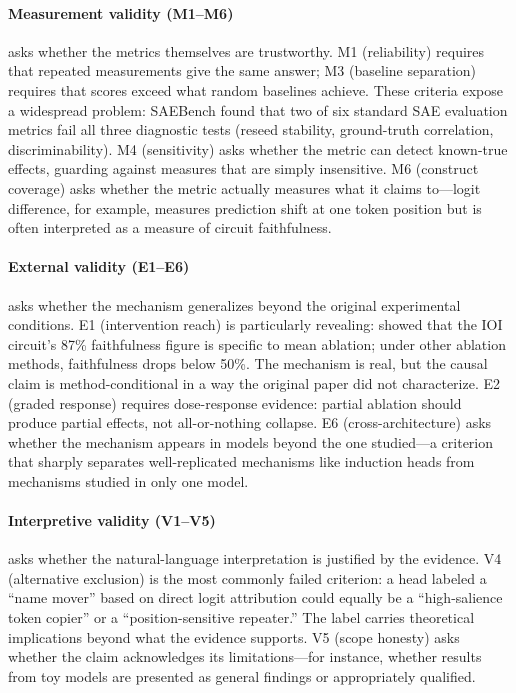 \documentclass[10pt]{article}
\begin{document}
\paragraph{Measurement validity (M1--M6)} asks whether the metrics themselves are trustworthy. M1 (reliability) requires that repeated measurements give the same answer; M3 (baseline separation) requires that scores exceed what random baselines achieve. These criteria expose a widespread problem: SAEBench found that two of six standard SAE evaluation metrics fail all three diagnostic tests (reseed stability, ground-truth correlation, discriminability). M4 (sensitivity) asks whether the metric can detect known-true effects, guarding against measures that are simply insensitive. M6 (construct coverage) asks whether the metric actually measures what it claims to---logit difference, for example, measures prediction shift at one token position but is often interpreted as a measure of circuit faithfulness.

\paragraph{External validity (E1--E6)} asks whether the mechanism generalizes beyond the original experimental conditions. E1 (intervention reach) is particularly revealing: \citet{miller2024transformer} showed that the IOI circuit's 87\% faithfulness figure is specific to mean ablation; under other ablation methods, faithfulness drops below 50\%. The mechanism is real, but the causal claim is method-conditional in a way the original paper did not characterize. E2 (graded response) requires dose-response evidence: partial ablation should produce partial effects, not all-or-nothing collapse. E6 (cross-architecture) asks whether the mechanism appears in models beyond the one studied---a criterion that sharply separates well-replicated mechanisms like induction heads from mechanisms studied in only one model.

\paragraph{Interpretive validity (V1--V5)} asks whether the natural-language interpretation is justified by the evidence. V4 (alternative exclusion) is the most commonly failed criterion: a head labeled a ``name mover'' based on direct logit attribution could equally be a ``high-salience token copier'' or a ``position-sensitive repeater.'' The label carries theoretical implications beyond what the evidence supports. V5 (scope honesty) asks whether the claim acknowledges its limitations---for instance, whether results from toy models are presented as general findings or appropriately qualified.
\end{document}

